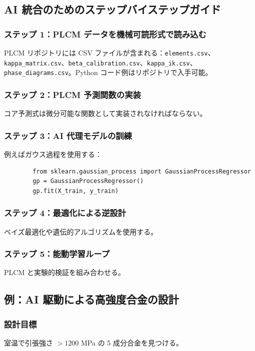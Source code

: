 \documentclass[11pt,a4paper]{article}
\theoremstyle{remark}
\begin{document}
	\subsection{AI 統合のためのステップバイステップガイド}
	
	\subsubsection{ステップ 1：PLCM データを機械可読形式で読み込む}
	PLCM リポジトリには CSV ファイルが含まれる：\texttt{elements.csv}、\texttt{kappa\_matrix.csv}、\texttt{beta\_calibration.csv}、\texttt{kappa\_ik.csv}、\texttt{phase\_diagrams.csv}。Python コード例はリポジトリで入手可能。
	
	\subsubsection{ステップ 2：PLCM 予測関数の実装}
	コア予測式は微分可能な関数として実装されなければならない。
	
	\subsubsection{ステップ 3：AI 代理モデルの訓練}
	例えばガウス過程を使用する：
	\begin{verbatim}
		from sklearn.gaussian_process import GaussianProcessRegressor
		gp = GaussianProcessRegressor()
		gp.fit(X_train, y_train)
	\end{verbatim}
	
	\subsubsection{ステップ 4：最適化による逆設計}
	ベイズ最適化や遺伝的アルゴリズムを使用する。
	
	\subsubsection{ステップ 5：能動学習ループ}
	PLCM と実験的検証を組み合わせる。
	
	\subsection{例：AI 駆動による高強度合金の設計}
	
	\subsubsection{設計目標}
	室温で引張強さ \(> 1200\) MPa の 5 成分合金を見つける。
	
\end{document}
